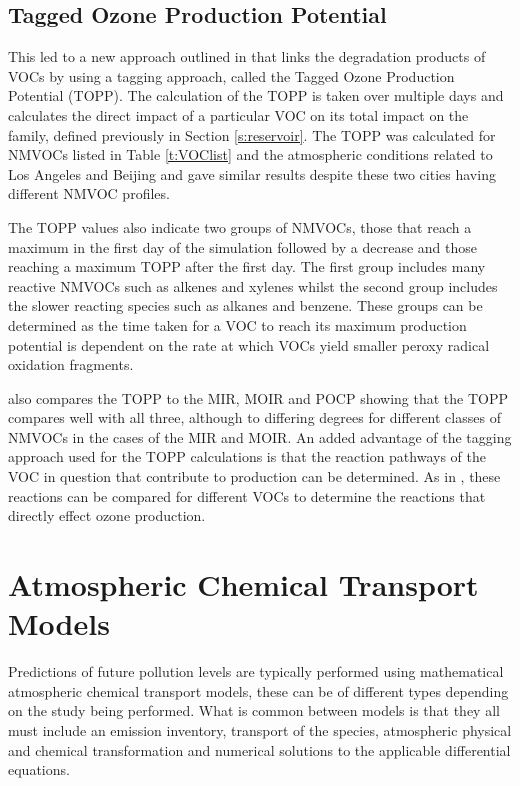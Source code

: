 \subsection{Tagged Ozone Production Potential} \label{s:TOPP}
This led to a new approach outlined in \citep{Butler:2011} that links the degradation products of VOCs by using a tagging approach, called the Tagged Ozone Production Potential (TOPP). 
The calculation of the TOPP is taken over multiple days and calculates the direct impact of a particular VOC on its total impact on the  family, defined previously in Section \ref{s:reservoir}. 
The TOPP was calculated for NMVOCs listed in Table \ref{t:VOClist} and the atmospheric conditions related to Los Angeles and Beijing and gave similar results despite these two cities having different NMVOC profiles. 

The TOPP values also indicate two groups of NMVOCs, those that reach a maximum in the first day of the simulation followed by a decrease and those reaching a maximum TOPP after the first day. 
The first group includes many reactive NMVOCs such as alkenes and xylenes whilst the second group includes the slower reacting species such as alkanes and benzene. 
These groups can be determined as the time taken for a VOC to reach its maximum  production potential is dependent on the rate at which VOCs yield smaller peroxy radical oxidation fragments. 

\citep{Butler:2011} also compares the TOPP to the MIR, MOIR and POCP showing that the TOPP compares well with all three, although to differing degrees for different classes of NMVOCs in the cases of the MIR and MOIR. 
An added advantage of the tagging approach used for the TOPP calculations is that the reaction pathways of the VOC in question that contribute to  production can be determined. 
As in \citep{Butler:2011}, these reactions can be compared for different VOCs to determine the reactions that directly effect ozone production.

\section{Atmospheric Chemical Transport Models}
Predictions of future  pollution levels are typically performed using mathematical atmospheric chemical transport models, these can be of different types depending on the study being performed. 
What is common between models is that they all must include an emission inventory, transport of the species, atmospheric physical and chemical transformation and numerical solutions to the applicable differential equations. 

